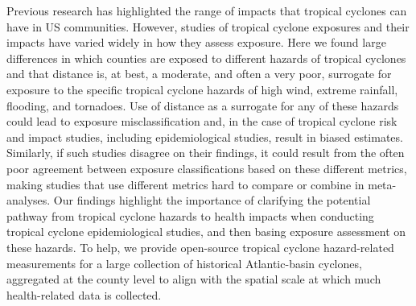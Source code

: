 Previous research has highlighted the range of impacts that tropical cyclones
can have in \ac{US} communities. However, studies of tropical cyclone exposures
and their impacts have varied widely in how they assess exposure. Here we found
large differences in which counties are exposed to different hazards of
tropical cyclones and that distance is, at best, a moderate, and often a very
poor, surrogate for exposure to the specific tropical cyclone hazards of high
wind, extreme rainfall, flooding, and tornadoes. Use of distance as a surrogate
for any of these hazards could lead to exposure misclassification and, in the
case of tropical cyclone risk and impact studies, including epidemiological
studies, result in biased estimates.  Similarly, if such studies disagree on
their findings, it could result from the often poor agreement between exposure
classifications based on these different metrics, making studies that use
different metrics hard to compare or combine in meta-analyses. Our findings
highlight the importance of clarifying the potential pathway from tropical
cyclone hazards to health impacts when conducting tropical cyclone
epidemiological studies, and then basing exposure assessment on these hazards.
To help, we provide open-source tropical cyclone hazard-related measurements
for a large collection of historical Atlantic-basin cyclones, aggregated at the
county level to align with the spatial scale at which much health-related data
is collected.
